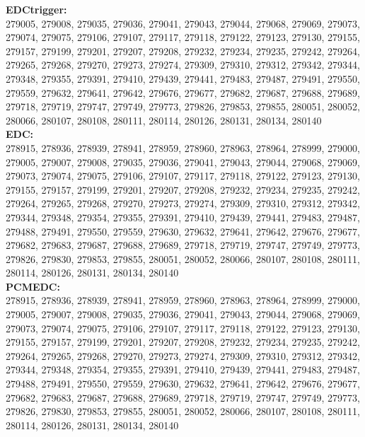 \textbf{EDCtrigger:}\\
 279005, 279008, 279035, 279036, 279041, 279043, 279044, 279068, 279069, 279073, 279074, 279075, 279106, 279107, 279117, 279118, 279122, 279123, 279130, 279155, 279157, 279199, 279201, 279207, 279208, 279232, 279234, 279235, 279242, 279264, 279265, 279268, 279270, 279273, 279274, 279309, 279310, 279312, 279342, 279344, 279348, 279355, 279391, 279410, 279439, 279441, 279483, 279487, 279491, 279550, 279559, 279632, 279641, 279642, 279676, 279677, 279682, 279687, 279688, 279689, 279718, 279719, 279747, 279749, 279773, 279826, 279853, 279855, 280051, 280052, 280066, 280107, 280108, 280111, 280114, 280126, 280131, 280134, 280140\\

 \textbf{EDC:}\\
278915, 278936, 278939, 278941, 278959, 278960, 278963, 278964, 278999, 279000, 279005, 279007, 279008, 279035, 279036, 279041, 279043, 279044, 279068, 279069, 279073, 279074, 279075, 279106, 279107, 279117, 279118, 279122, 279123, 279130, 279155, 279157, 279199, 279201, 279207, 279208, 279232, 279234, 279235, 279242, 279264, 279265, 279268, 279270, 279273, 279274, 279309, 279310, 279312, 279342, 279344, 279348, 279354, 279355, 279391, 279410, 279439, 279441, 279483, 279487, 279488, 279491, 279550, 279559, 279630, 279632, 279641, 279642, 279676, 279677, 279682, 279683, 279687, 279688, 279689, 279718, 279719, 279747, 279749, 279773, 279826, 279830, 279853, 279855, 280051, 280052, 280066, 280107, 280108, 280111, 280114, 280126, 280131, 280134, 280140\\

 \textbf{PCMEDC:}\\
278915, 278936, 278939, 278941, 278959, 278960, 278963, 278964, 278999, 279000, 279005, 279007, 279008, 279035, 279036, 279041, 279043, 279044, 279068, 279069, 279073, 279074, 279075, 279106, 279107, 279117, 279118, 279122, 279123, 279130, 279155, 279157, 279199, 279201, 279207, 279208, 279232, 279234, 279235, 279242, 279264, 279265, 279268, 279270, 279273, 279274, 279309, 279310, 279312, 279342, 279344, 279348, 279354, 279355, 279391, 279410, 279439, 279441, 279483, 279487, 279488, 279491, 279550, 279559, 279630, 279632, 279641, 279642, 279676, 279677, 279682, 279683, 279687, 279688, 279689, 279718, 279719, 279747, 279749, 279773, 279826, 279830, 279853, 279855, 280051, 280052, 280066, 280107, 280108, 280111, 280114, 280126, 280131, 280134, 280140\\

